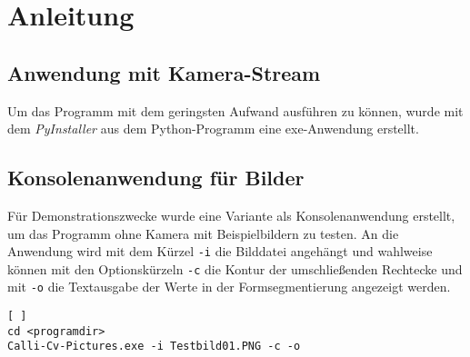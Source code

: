 
\section{Anleitung}
\label{sec:Anleitung}

\subsection{Anwendung mit Kamera-Stream}
Um das Programm mit dem geringsten Aufwand ausführen zu können, wurde mit dem \emph{PyInstaller} aus dem Python-Programm eine exe-Anwendung erstellt.

\subsection{Konsolenanwendung für Bilder}
Für Demonstrationszwecke wurde eine Variante als Konsolenanwendung erstellt, um das Programm ohne Kamera mit Beispielbildern zu testen. 
An die Anwendung wird mit dem Kürzel \lstinline{-i} die Bilddatei angehängt und wahlweise können mit den Optionskürzeln  \lstinline{-c} die Kontur der umschließenden Rechtecke und mit  \lstinline{-o} die Textausgabe der Werte in der Formsegmentierung angezeigt werden.
\begin{lstlisting}[ ]
cd <programdir>
Calli-Cv-Pictures.exe -i Testbild01.PNG -c -o
\end{lstlisting}
